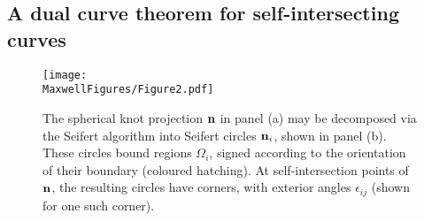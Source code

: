     \subsection{A dual curve theorem for self-intersecting curves}
    \label{subsec:GaussBonnetSelfIntersecting}
    \begin{figure}
        \centering
        \texttt{[image: \\MaxwellFigures/Figure2.pdf]}
        \caption[Decomposition of the spherical knot projection.]{The spherical knot projection $\bf n$ in panel (a) may be decomposed via the Seifert algorithm into Seifert circles ${\bf n}_i$, shown in panel (b). These circles bound regions $\Omega_i$, signed according to the orientation of their boundary (coloured hatching). At self-intersection points of $\bf n$, the resulting circles have corners, with exterior angles $\epsilon_{ij}$ (shown for one such corner).}
        \label{fig:GaussBonnet} 
    \end{figure}

